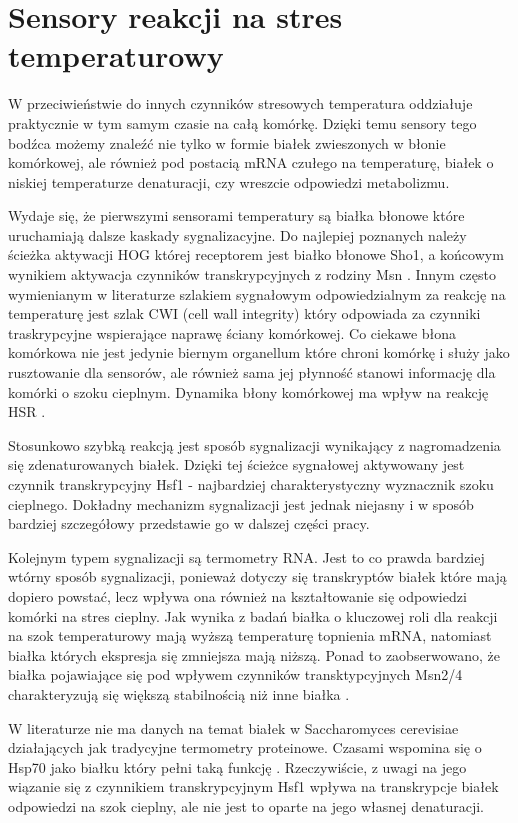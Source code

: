 \documentclass{pracamgr}
\begin{document}
\section{Sensory reakcji na stres temperaturowy}

W przeciwieństwie do innych czynników stresowych temperatura oddziałuje praktycznie w tym samym czasie na całą komórkę. 
Dzięki temu sensory tego bodźca możemy znaleźć nie tylko w formie białek zwieszonych w błonie komórkowej, ale również 
pod postacią mRNA czułego na temperaturę, białek o niskiej temperaturze denaturacji, czy wreszcie odpowiedzi metabolizmu.

Wydaje się, że pierwszymi sensorami temperatury są białka błonowe które uruchamiają dalsze kaskady sygnalizacyjne. Do 
najlepiej poznanych należy ścieżka aktywacji HOG której receptorem jest białko błonowe Sho1, a końcowym wynikiem 
aktywacja czynników transkrypcyjnych z rodziny Msn \cite{SensingLesson}. Innym często wymienianym w literaturze szlakiem sygnałowym odpowiedzialnym 
za reakcję na temperaturę jest szlak CWI (cell wall integrity) który odpowiada za czynniki traskrypcyjne wspierające 
naprawę ściany komórkowej. \cite{CWI} 
Co ciekawe błona komórkowa nie jest jedynie biernym organellum które chroni
komórkę i służy jako rusztowanie dla sensorów, ale również sama jej płynność stanowi informację dla komórki o szoku cieplnym.
Dynamika błony komórkowej ma wpływ na reakcję HSR \cite{Carratu96}.

Stosunkowo szybką reakcją jest sposób sygnalizacji wynikający z nagromadzenia się zdenaturowanych białek. Dzięki tej ścieżce
sygnałowej aktywowany jest czynnik transkrypcyjny Hsf1 - najbardziej charakterystyczny wyznacznik szoku cieplnego. Dokładny mechanizm
sygnalizacji jest jednak niejasny i w sposób bardziej szczegółowy przedstawie go w dalszej części pracy.

Kolejnym typem sygnalizacji są termometry RNA. Jest to co prawda bardziej wtórny sposób sygnalizacji, ponieważ dotyczy się
transkryptów białek które mają dopiero powstać, lecz wpływa ona również na kształtowanie się odpowiedzi komórki na stres cieplny.
Jak wynika z badań białka o kluczowej roli dla reakcji na szok temperaturowy mają wyższą temperaturę topnienia mRNA, natomiast białka 
których ekspresja się zmniejsza mają niższą. Ponad to zaobserwowano, że białka pojawiające się pod wpływem czynników transktypcyjnych Msn2/4
charakteryzują się większą stabilnością niż inne białka \cite{RNAterm,Roca11}.

W literaturze nie ma danych na temat białek w Saccharomyces cerevisiae działających jak tradycyjne termometry proteinowe. Czasami
wspomina się o Hsp70 jako białku który pełni taką funkcję \cite{Hsp70thermometer}. Rzeczywiście, z uwagi na jego wiązanie się z czynnikiem transkrypcyjnym Hsf1
wpływa na transkrypcje białek odpowiedzi na szok cieplny, ale nie jest to oparte na jego własnej denaturacji.
\end{document}
